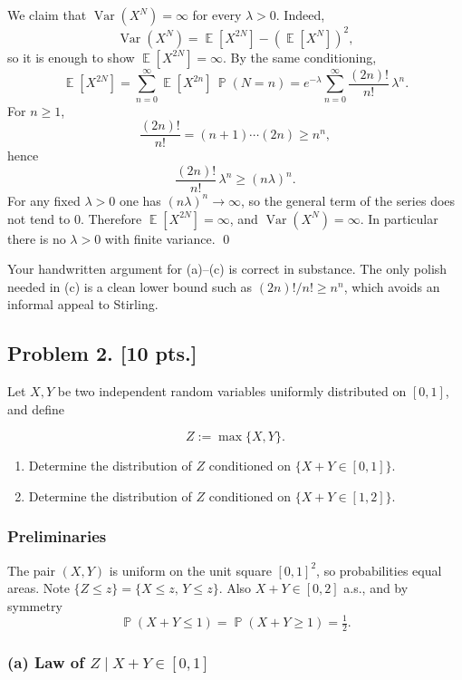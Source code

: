 \documentclass[11pt,a4paper]{article}
\DeclareMathOperator{\Var}{Var}
\DeclareMathOperator{\E}{\mathbb{E}}
\DeclareMathOperator{\Pbb}{\mathbb{P}}
\begin{document}
We claim that \(\Var(X^N)=\infty\) for every \(\lambda>0\). Indeed,
\[
\Var(X^N)
=
\E[X^{2N}]-(\E[X^N])^2,
\]
so it is enough to show \(\E[X^{2N}]=\infty\). By the same conditioning,
\[
\E[X^{2N}]
=
\sum_{n=0}^\infty \E[X^{2n}]\,\Pbb(N=n)
=
e^{-\lambda}\sum_{n=0}^\infty \frac{(2n)!}{n!}\,\lambda^n.
\]
For \(n\ge 1\),
\[
\frac{(2n)!}{n!}
=
(n+1)\cdots(2n)
\ge
n^n,
\]
hence
\[
\frac{(2n)!}{n!}\,\lambda^n
\ge
(n\lambda)^n.
\]
For any fixed \(\lambda>0\) one has \((n\lambda)^n\to\infty\), so the general term of the series does not tend to \(0\). Therefore \(\E[X^{2N}]=\infty\), and \(\Var(X^N)=\infty\). In particular there is no \(\lambda>0\) with finite variance.
\qed

\begin{remark*}
Your handwritten argument for (a)--(c) is correct in substance. The only polish needed in (c) is a clean lower bound such as \((2n)!/n!\ge n^n\), which avoids an informal appeal to Stirling.
\end{remark*}

\subsection{Problem 2. [10 pts.]}
Let \( X, Y \) be two independent random variables uniformly distributed on \( [0, 1] \), and define

\[
Z := \max\{X, Y\}.
\]

\begin{enumerate}[label=(\alph*)]
    \item Determine the distribution of \( Z \) conditioned on \( \{X + Y \in [0, 1]\} \).
    \item Determine the distribution of \( Z \) conditioned on \( \{X + Y \in [1, 2]\} \).
\end{enumerate}

\setcounter{section}{2}
\setcounter{theorem}{0}
\setcounter{definition}{0}
\setcounter{remark}{0}
\setcounter{note}{0}

\subsubsection{Preliminaries}

The pair \((X,Y)\) is uniform on the unit square \([0,1]^2\), so probabilities equal areas. Note \(\{Z\le z\}=\{X\le z,\,Y\le z\}\). Also \(X+Y\in[0,2]\) a.s., and by symmetry
\[
\Pbb(X+Y\le 1)=\Pbb(X+Y\ge 1)=\tfrac12.
\]

\subsubsection{(a) Law of \(Z\mid X+Y\in[0,1]\)}
\end{document}
